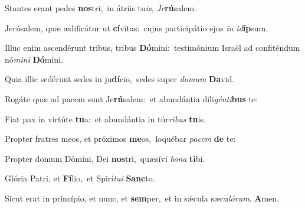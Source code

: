 \setcounter{versecount}{2}

\vs Stantes erant pedes \textbf{nos}tri,~\redgreheightstar in átriis tu\textit{is}, \textit{Je}\textbf{rú}salem.

\vs Jerúsalem, quæ ædificátur ut \textbf{cí}vitas:~\redgreheightstar cujus participátio ejus \textit{in} \textit{id}\textbf{íp}sum.

\vs Illuc enim ascendérunt tribus, tribus \textbf{Dó}mini:~\redgreheightstar testimónium Israël ad confiténdum nó\textit{mi}\textit{ni} \textbf{Dó}mini.

\vs Quia illic sedérunt sedes in ju\textbf{dí}cio,~\redgreheightstar sedes super \textit{do}\textit{mum} \textbf{Da}vid.

\vs Rogáte quæ ad pacem sunt Je\textbf{rú}salem:~\redgreheightstar et abundántia dili\textit{gén}\textit{ti}\textbf{bus} te:

\vs Fiat pax in virtúte \textbf{tu}a:~\redgreheightstar et abundántia in túr\textit{ri}\textit{bus} \textbf{tu}is.

\vs Propter fratres meos, et próximos \textbf{me}os,~\redgreheightstar loquébar \textit{pa}\textit{cem} \textbf{de} te:

\vs Propter domum Dómini, Dei \textbf{nos}tri,~\redgreheightstar quæsívi \textit{bo}\textit{na} \textbf{ti}bi.

\vs Glória Patri, et \textbf{Fí}lio,~\redgreheightstar et Spirí\textit{tu}\textit{i} \textbf{Sanc}to.

\vs Sicut erat in princípio, et nunc, et \textbf{sem}per,~\redgreheightstar et in sǽcula sæcu\textit{ló}\textit{rum}. \textbf{A}men.


